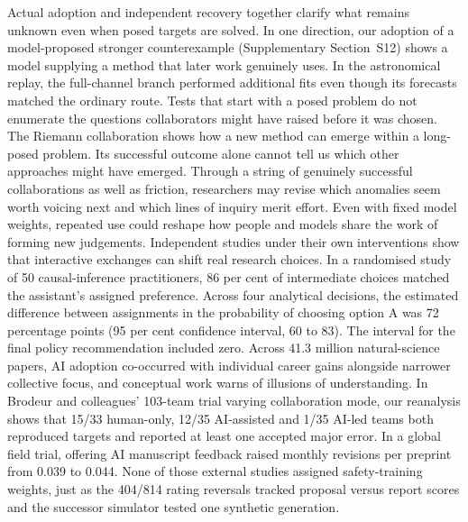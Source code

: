 Actual adoption and independent recovery together clarify what remains unknown even when posed targets are solved. In one direction, our adoption of a model-proposed stronger counterexample (Supplementary Section~S12) shows a model supplying a method that later work genuinely uses. In the astronomical replay, the full-channel branch performed additional fits even though its forecasts matched the ordinary route. Tests that start with a posed problem do not enumerate the questions collaborators might have raised before it was chosen. The Riemann collaboration shows how a new method can emerge within a long-posed problem. Its successful outcome alone cannot tell us which other approaches might have emerged. Through a string of genuinely successful collaborations as well as friction, researchers may revise which anomalies seem worth voicing next and which lines of inquiry merit effort. Even with fixed model weights, repeated use could reshape how people and models share the work of forming new judgements. Independent studies under their own interventions show that interactive exchanges can shift real research choices. In a randomised study of 50 causal-inference practitioners, 86 per cent of intermediate choices matched the assistant's assigned preference. Across four analytical decisions, the estimated difference between assignments in the probability of choosing option A was 72 percentage points (95 per cent confidence interval, 60 to 83). The interval for the final policy recommendation included zero.\cite{EXPERT} Across 41.3 million natural-science papers, AI adoption co-occurred with individual career gains alongside narrower collective focus,\cite{HAO} and conceptual work warns of illusions of understanding.\cite{MESS} In Brodeur and colleagues' 103-team trial varying collaboration mode, our reanalysis shows that 15/33 human-only, 12/35 AI-assisted and 1/35 AI-led teams both reproduced targets and reported at least one accepted major error. In a global field trial, offering AI manuscript feedback raised monthly revisions per preprint from 0.039 to 0.044.\cite{WANG} None of those external studies assigned safety-training weights, just as the 404/814 rating reversals tracked proposal versus report scores and the successor simulator tested one synthetic generation.

